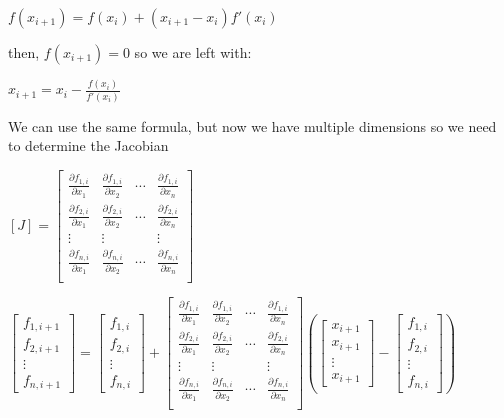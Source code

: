 \documentclass[11pt]{article}
\begin{document}
$f(x_{i+1})=f(x_{i})+(x_{i+1}-x_{i})f'(x_{i})$

then, $f(x_{i+1})=0$ so we are left with:

$x_{i+1}=x_{i}-\frac{f(x_{i})}{f'(x_{i})}$

We can use the same formula, but now we have multiple dimensions so we
need to determine the Jacobian

$[J]=\left[ \begin{array}{cccc} \frac{\partial f_{1,i}}{\partial x_{1}} & \frac{\partial f_{1,i}}{\partial x_{2}} & \cdots & \frac{\partial f_{1,i}}{\partial x_{n}} \\ \frac{\partial f_{2,i}}{\partial x_{1}} & \frac{\partial f_{2,i}}{\partial x_{2}} & \cdots & \frac{\partial f_{2,i}}{\partial x_{n}} \\ \vdots & \vdots & & \vdots \\ \frac{\partial f_{n,i}}{\partial x_{1}} & \frac{\partial f_{n,i}}{\partial x_{2}} & \cdots & \frac{\partial f_{n,i}}{\partial x_{n}} \\ \end{array} \right]$

$\left[ \begin{array}{c} f_{1,i+1} \\ f_{2,i+1} \\ \vdots \\ f_{n,i+1}\end{array} \right]= \left[ \begin{array}{c} f_{1,i} \\ f_{2,i} \\ \vdots \\ f_{n,i}\end{array} \right]+ \left[ \begin{array}{cccc} \frac{\partial f_{1,i}}{\partial x_{1}} & \frac{\partial f_{1,i}}{\partial x_{2}} & \cdots & \frac{\partial f_{1,i}}{\partial x_{n}} \\ \frac{\partial f_{2,i}}{\partial x_{1}} & \frac{\partial f_{2,i}}{\partial x_{2}} & \cdots & \frac{\partial f_{2,i}}{\partial x_{n}} \\ \vdots & \vdots & & \vdots \\ \frac{\partial f_{n,i}}{\partial x_{1}} & \frac{\partial f_{n,i}}{\partial x_{2}} & \cdots & \frac{\partial f_{n,i}}{\partial x_{n}} \\ \end{array} \right] \left( \left[ \begin{array}{c} x_{i+1} \\ x_{i+1} \\ \vdots \\ x_{i+1}\end{array} \right]- \left[ \begin{array}{c} f_{1,i} \\ f_{2,i} \\ \vdots \\ f_{n,i}\end{array} \right]\right)$
\end{document}
